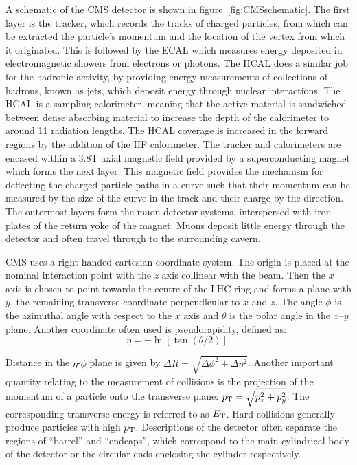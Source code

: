 A schematic of the CMS detector is shown in figure~\ref{fig:CMSschematic}. 
The first layer is the tracker, which records the tracks of charged particles,
from which can be extracted the particle's momentum and the location of the
vertex from which it originated. This is followed by the \ac{ECAL} which measures
energy deposited in electromagnetic showers from electrons or photons. The
\ac{HCAL} does a similar job for the hadronic activity, by providing energy
measurements of collections of hadrons, known as jets, which deposit energy
through nuclear interactions. The \ac{HCAL} is a sampling calorimeter, meaning
that the active material is sandwiched between dense absorbing material to
increase the depth of the calorimeter to around 11 radiation lengths. The
\ac{HCAL} coverage is increased in the forward regions by the addition of 
the \ac{HF} calorimeter. The tracker and calorimeters are encased within a 3.8T axial magnetic
field provided by a superconducting magnet which forms the next layer. This
magnetic field provides the mechanism for deflecting the charged particle paths in
a curve such that their momentum can be measured by the size of the curve in the
track and their charge by the direction. The
outermost layers form the muon detector systems, interspersed with iron plates
of the return yoke of the magnet. Muons deposit little energy
through the detector and often travel through to the surrounding cavern. 

CMS uses a right handed cartesian coordinate system. The
origin is placed at the nominal interaction point with the $z$ axis collinear with the
beam. Then the $x$ axis is chosen to point towards the centre of the LHC ring
and forms a plane with $y$, the remaining transverse coordinate perpendicular to
$x$ and $z$. The angle $\phi$ is the azimuthal angle with respect to the $x$
axis and $\theta$ is the polar angle in the $x$--$y$ plane. Another coordinate
often used is pseudorapidity, defined as:
\begin{equation}
\eta = - \ln[\tan(\theta/2)]. 
\end{equation}

Distance in the $\eta$-$\phi$ plane is given by $\Delta R =
\sqrt{\Delta\phi^{2} + \Delta\eta^{2}}$.
Another important quantity relating to the measurement of collisions is the
projection of the momentum of a particle onto the transverse plane: $p_{\mathrm{T}} =
\sqrt{p_{x}^{2} + p_{y}^{2}}$. The corresponding transverse energy is referred
to as $E_{\text T}$. Hard collisions generally produce particles with
high $p_{\mathrm{T}}$. Descriptions of the detector often separate the regions of
``barrel'' and ``endcaps'', which correspond to the main cylindrical body of
the detector or the circular ends enclosing the cylinder respectively. 


